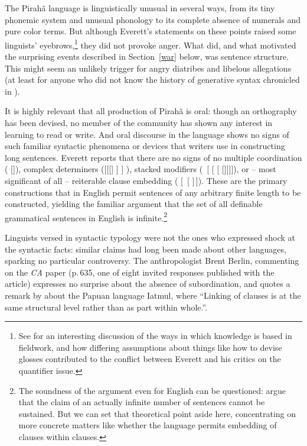 \documentclass[output=paper,colorlinks,citecolor=brown
]{langscibook}
\begin{document}
The Pirah{\~a} language is linguistically unusual in several ways,
from its tiny phonemic system and unusual phonology to its complete
absence of numerals and pure color terms. But although Everett's
statements on these points raised some linguists'
eyebrows,\footnote{\label{dobrin}
   See \citealt{DobrSchw21} for an interesting discussion of the ways
   in which knowledge is based in fieldwork, and how differing
   assumptions about things like how to devise glosses contributed
   to the conflict between Everett and his critics on the quantifier
   issue.}
they did not provoke anger. What did, and what motivated the surprising
events described in Section~\ref{war} below, was sentence structure.
This might seem an unlikely trigger for angry diatribes and libelous
allegations (at least for anyone who did not know the history of
generative syntax chronicled in \citealt{Harris21}).

It is highly relevant that all production of Pirah{\~a} is oral:
though an orthography has been devised, no member of the community
has shown any interest in learning to read or write. And oral
discourse in the language shows no signs of such familiar syntactic
phenomena or devices that writers use in constructing long sentences.
Everett reports that there are no signs of no multiple coordination
( []),
complex determiners ([[[] ] ]
), stacked modifiers (~[ [
[ []]]]), or -- most significant
of all -- reiterable clause embedding ( [\, [\,\,]\,]). These are the primary
constructions that in English permit sentences of any arbitrary finite
length to be constructed, yielding the familiar argument that the set
of all definable grammatical sentences in English is
infinite.\footnote{\label{infinity}
   The soundness of the argument even for English can be questioned:
   \citet[115--124]{PullScho10} argue that
   the claim of an actually infinite number of sentences cannot be
   sustained. But we can set that theoretical point aside here,
   concentrating on more concrete matters like whether the language
   permits embedding of clauses within clauses.}

\label{page-non-infinite-languages-start}Linguists versed in syntactic
typology were not the ones who expressed shock at the syntactic facts:
similar claims had long been made about other languages, sparking no
particular controversy. The anthropologist Brent Berlin, commenting
on the \textit{CA} paper (p.\,635, one of eight invited responses
published with the article) expresses no surprise about the absence
of subordination, and quotes a remark by \citet[177]{Foley86}
about the Papuan language Iatmul, where ``Linking of clauses is at the
same structural level rather than as part within whole.''.
\end{document}
